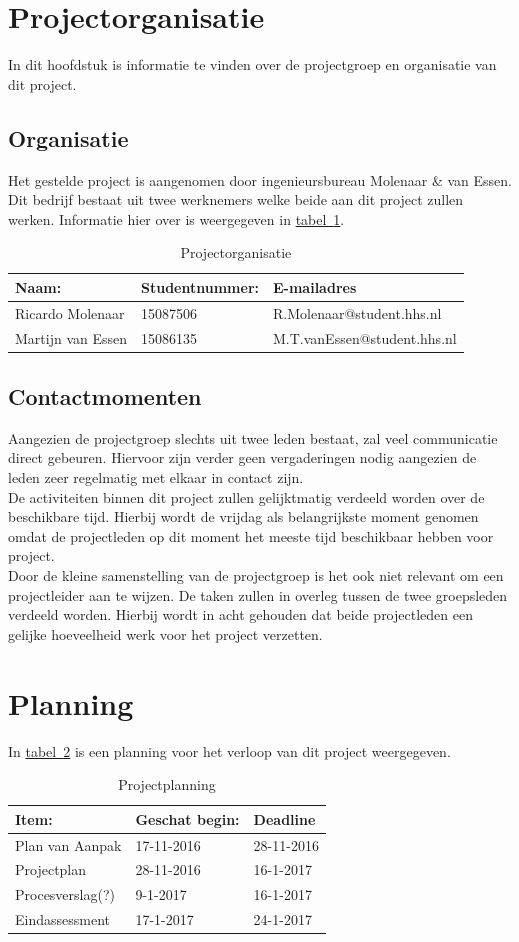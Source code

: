 \documentclass[numbers=endperiod]{scrartcl}
\newcommand{\sectionSmall}[1]{
	\vspace{-10pt}
	\section{#1}
	\vspace{-5pt}
}
\newcommand{\whitespace}{\vspace*{2 mm} \\}%
\newcommand{\tableref}[1]{\hyperref[table:#1]{tabel~\ref{table:#1}}}
\begin{document}
	\sectionSmall{Projectorganisatie}
	In dit hoofdstuk is informatie te vinden over de projectgroep en organisatie van dit project.
	\subsection{Organisatie}
	Het gestelde project is aangenomen door ingenieursbureau Molenaar \& van Essen. Dit bedrijf bestaat uit
	twee werknemers welke beide aan dit project zullen werken. Informatie hier over is weergegeven in \tableref{Projectorganisatie}. 
	\begin{table}[h]
		\caption{Projectorganisatie}\label{table:Projectorganisatie}
		
		\centering
		\begin{tabular}{ p{} | p{} | p{} }
			Naam: 				& Studentnummer:& E-mailadres \\ \hline
			Ricardo Molenaar 	& 15087506	 	& R.Molenaar@student.hhs.nl \\
			Martijn van Essen 	& 15086135		& M.T.vanEssen@student.hhs.nl \\
		\end{tabular}
		
	\end{table}
	\subsection{Contactmomenten}
	Aangezien de projectgroep slechts uit twee leden bestaat, zal veel communicatie direct gebeuren. Hiervoor zijn verder geen vergaderingen nodig aangezien de leden zeer regelmatig met elkaar in contact zijn.
	\whitespace
	De activiteiten binnen dit project zullen gelijktmatig verdeeld worden over de beschikbare tijd. Hierbij wordt de vrijdag als belangrijkste moment genomen omdat de projectleden op dit moment het meeste tijd beschikbaar hebben voor project.
	\whitespace
	Door de kleine samenstelling van de projectgroep is het ook niet relevant om een projectleider aan te wijzen. De taken zullen in overleg tussen de twee groepsleden verdeeld worden. Hierbij wordt in acht gehouden dat beide projectleden een gelijke hoeveelheid werk voor het project verzetten.
	
	\sectionSmall{Planning}
	In \tableref{Planning} is een planning voor het verloop van dit project weergegeven.
	\begin{table}[h]
		\caption{Projectplanning}\label{table:Planning}
		\centering
		\begin{tabular}{| p{} | p{} | p{} |}
			\hline \rowcolor{hhs_theme_heading_2}
			Item: 				& Geschat begin:& Deadline \\ \hline
			Plan van Aanpak 	& 17-11-2016 	& 28-11-2016 \\ \hline
			Projectplan		 	& 28-11-2016	& 16-1-2017 \\ \hline
			Procesverslag(?)	& 9-1-2017		& 16-1-2017 \\ \hline
			Eindassessment		& 17-1-2017		& 24-1-2017 \\ \hline
		\end{tabular}
	\end{table}
	\newpage
	
	\printbibliography
	
	
\end{document}
